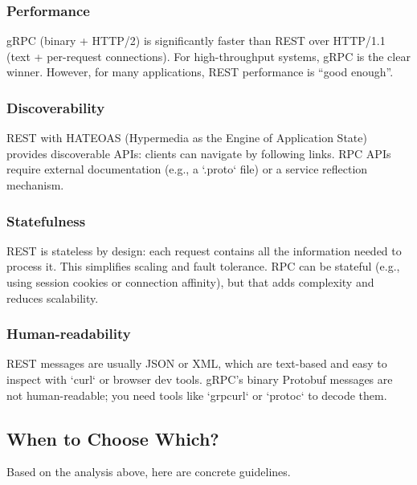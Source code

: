 \documentclass[10pt,a4paper]{article}
\begin{document}
\subsubsection{Performance}
gRPC (binary + HTTP/2) is significantly faster than REST over HTTP/1.1 (text + per-request connections). For high-throughput systems, gRPC is the clear winner. However, for many applications, REST performance is “good enough”.

\subsubsection{Discoverability}
REST with HATEOAS (Hypermedia as the Engine of Application State) provides discoverable APIs: clients can navigate by following links. RPC APIs require external documentation (e.g., a `.proto` file) or a service reflection mechanism.

\subsubsection{Statefulness}
REST is stateless by design: each request contains all the information needed to process it. This simplifies scaling and fault tolerance. RPC can be stateful (e.g., using session cookies or connection affinity), but that adds complexity and reduces scalability.

\subsubsection{Human-readability}
REST messages are usually JSON or XML, which are text-based and easy to inspect with `curl` or browser dev tools. gRPC’s binary Protobuf messages are not human-readable; you need tools like `grpcurl` or `protoc` to decode them.

\subsection{When to Choose Which?}
Based on the analysis above, here are concrete guidelines.
\end{document}
